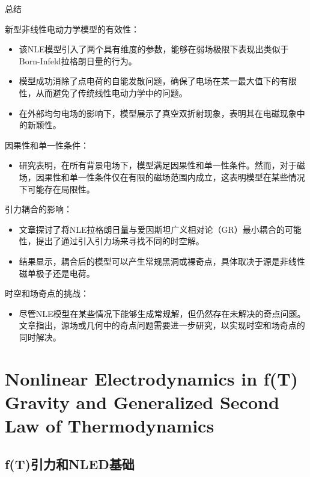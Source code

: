 \documentclass[9pt, dvipsnames]{beamer} %
\begin{document}
\begin{frame}{总结}

    新型非线性电动力学模型的有效性：
\begin{itemize}
    \item 该NLE模型引入了两个具有维度的参数，能够在弱场极限下表现出类似于Born-Infeld拉格朗日量的行为。

    \item 模型成功消除了点电荷的自能发散问题，确保了电场在某一最大值下的有限性，从而避免了传统线性电动力学中的问题。
    
    \item 在外部均匀电场的影响下，模型展示了真空双折射现象，表明其在电磁现象中的新颖性。
\end{itemize}

因果性和单一性条件：

\begin{itemize}
    \item 研究表明，在所有背景电场下，模型满足因果性和单一性条件。然而，对于磁场，因果性和单一性条件仅在有限的磁场范围内成立，这表明模型在某些情况下可能存在局限性。
\end{itemize}

引力耦合的影响：

\begin{itemize}
    \item 文章探讨了将NLE拉格朗日量与爱因斯坦广义相对论（GR）最小耦合的可能性，提出了通过引入引力场来寻找不同的时空解。

    \item 结果显示，耦合后的模型可以产生常规黑洞或裸奇点，具体取决于源是非线性磁单极子还是电荷。
\end{itemize}


时空和场奇点的挑战：

\begin{itemize}
    \item 尽管NLE模型在某些情况下能够生成常规解，但仍然存在未解决的奇点问题。文章指出，源场或几何中的奇点问题需要进一步研究，以实现时空和场奇点的同时解决。
\end{itemize}
\end{frame}

\section{Nonlinear Electrodynamics in f(T) Gravity and Generalized Second Law of Thermodynamics}



\subsection{f(T)引力和NLED基础}
\end{document}
